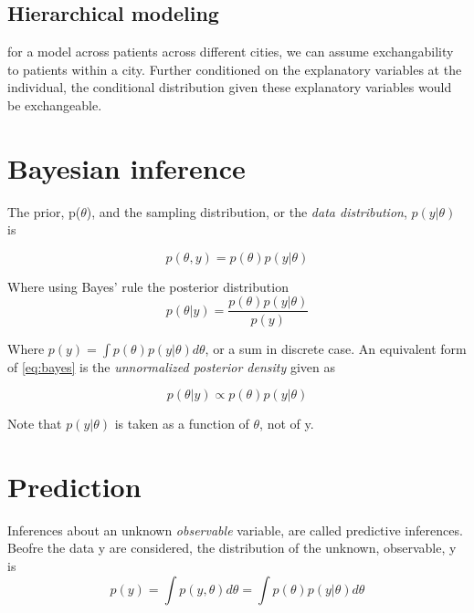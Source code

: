 \documentclass[
]{book}
\theoremstyle{definition}
\theoremstyle{definition}
\theoremstyle{definition}
\theoremstyle{definition}
\theoremstyle{remark}
\begin{document}
\hypertarget{hierarchical-modeling}{%
\subsection*{Hierarchical modeling}\label{hierarchical-modeling}}

for a model across patients across different cities, we can assume exchangability to patients within a city. Further conditioned on the explanatory variables at the individual, the conditional distribution given these explanatory variables would be exchangeable.

\hypertarget{bayesian-inference}{%
\section{Bayesian inference}\label{bayesian-inference}}

The prior, p(\(\theta\)), and the sampling distribution, or the \emph{data distribution}, \(p(y|\theta)\) is

\[ p(\theta,y) = p(\theta)p(y | \theta)\]

Where using Bayes' rule the posterior distribution
\begin{equation}
p(\theta | y ) = \frac{p(\theta)p(y| \theta)}{p(y)}
\label{eq:bayes}
\end{equation}

Where \(p(y) = \int p(\theta)p(y | \theta)d\theta\), or a sum in discrete case. An equivalent form of \eqref{eq:bayes} is the \emph{unnormalized posterior density} given as

\begin{equation}
p(\theta | y ) \propto p(\theta)p(y | \theta)
\label{eq:unnorm}
\end{equation}

Note that \(p(y | \theta)\) is taken as a function of \(\theta\), not of y.

\hypertarget{prediction}{%
\section*{Prediction}\label{prediction}}

Inferences about an unknown \emph{observable} variable, are called predictive inferences. Beofre the data y are considered, the distribution of the unknown, observable, y is \[ p(y) = \int p(y,\theta)d\theta = \int p(\theta)p(y | \theta)d\theta\]
\end{document}
